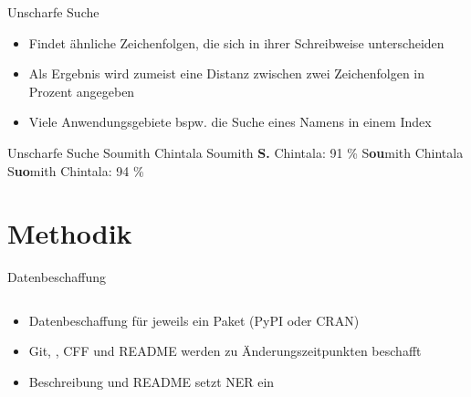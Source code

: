 \documentclass[%
    handout,
    aspectratio=1610,
    10pt,
    onlytextwidth, %
]{beamer}
\def\\{}%
\begin{document}
\begin{frame}{Unscharfe Suche}
    \begin{itemize}
        \item Findet ähnliche Zeichenfolgen, die sich in ihrer Schreibweise unterscheiden
        \item Als Ergebnis wird zumeist eine Distanz zwischen zwei Zeichenfolgen in Prozent angegeben
        \item Viele Anwendungsgebiete bspw. die Suche eines Namens in einem Index
    \end{itemize}
    \begin{exampleblock}{Unscharfe Suche}
        Soumith Chintala \leftrightarrow{} Soumith \textbf{S.} Chintala: 91 \% \\
        S\textbf{ou}mith Chintala \leftrightarrow{} S\textbf{uo}mith Chintala: 94 \%
    \end{exampleblock}
\end{frame}

\section{Methodik}

\begin{frame}{Datenbeschaffung}
    \begin{columns}
        \begin{column}[t]{0.39\textwidth}
            \begin{itemize}
                \item Datenbeschaffung für jeweils ein Paket (PyPI oder CRAN)
                \item Git, , CFF und README werden zu Änderungszeitpunkten beschafft
                \item Beschreibung und README setzt NER ein
            \end{itemize}
        \end{column}
        \begin{column}[t]{0.59\textwidth}
            \begin{center}
                
            \end{center}
        \end{column}
    \end{columns}
\end{frame}
\end{document}
